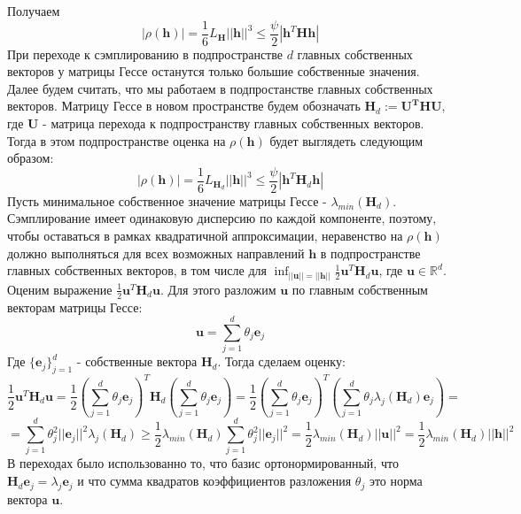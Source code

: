 \documentclass[11pt,a4paper]{article}
\begin{document}
Получаем
$$|\rho(\mathbf{h})| = \frac{1}{6}L_{\mathbf{H}}||\mathbf{h}||^3 \leq \frac{\psi}{2} |\mathbf{h}^T\mathbf{H}\mathbf{h}|$$
При переходе к сэмплированию в подпространстве $d$ главных собственных векторов у матрицы Гессе останутся только большие собственные значения.
\newline
Далее будем считать, что мы работаем в подпростанстве главных собственных векторов. \newline
Матрицу Гессе в новом пространстве будем обозначать $\mathbf{H}_d:= \mathbf{U^{\text{T}}HU}$, где $\mathbf{U}$ - матрица перехода к подпространству главных собственных векторов. \newline
Тогда в этом подпространстве оценка на $\rho(\mathbf{h})$ будет выглядеть следующим образом:
$$|\rho(\mathbf{h})| = \frac{1}{6}L_{\mathbf{H}_d}||\mathbf{h}||^3 \leq \frac{\psi}{2} |\mathbf{h}^T\mathbf{H}_d\mathbf{h}|$$
Пусть минимальное собственное значение матрицы Гессе - $\lambda_{min}(\mathbf{H}_d)$. \newline
Сэмплирование имеет одинаковую дисперсию по каждой компоненте, поэтому, чтобы оставаться в рамках квадратичной аппроксимации, неравенство на $\rho(\mathbf{h})$ должно выполняться для всех возможных направлений $\mathbf{h}$ в подпространстве главных собственных векторов, в том числе для $\displaystyle \inf_{||\mathbf{u}|| =||\mathbf{h}||}\frac{1}{2}\mathbf{u}^T\mathbf{H}_d\mathbf{u}$, где $\mathbf{u}\in \mathbb{R}^d$. 
\newline
Оценим выражение $\frac{1}{2}\mathbf{u}^T\mathbf{H}_d\mathbf{u}$. \newline
Для этого разложим $\mathbf{u}$ по главным собственным векторам матрицы Гессе:
$$\displaystyle \mathbf{u} = \sum_{j=1}^d \theta_j \mathbf{e}_j$$
Где $\{ \mathbf{e}_j \}_{j=1}^d$ - собственные вектора $\mathbf{H}_d$. \newline
Тогда сделаем оценку:
$$\frac{1}{2}\mathbf{u}^T\mathbf{H}_d\mathbf{u}=\frac{1}{2}\left( \sum_{j=1}^d \theta_j \mathbf{e}_j \right)^T \mathbf{H}_d \left( \sum_{j=1}^d \theta_j \mathbf{e}_j \right) = \frac{1}{2}\left( \sum_{j=1}^d \theta_j \mathbf{e}_j \right)^T \left( \sum_{j=1}^d \theta_j \lambda_j(\mathbf{H}_d)\mathbf{e}_j \right) = $$ $$=\sum_{j=1}^d \theta_j^2 ||\mathbf{e}_j||^2\lambda_j(\mathbf{H}_d) \geq \frac{1}{2}\lambda_{min}(\mathbf{H}_d)\sum_{j=1}^d \theta_j^2 ||\mathbf{e}_j||^2 = \frac{1}{2}\lambda_{min}(\mathbf{H}_d)||\mathbf{u}||^2 = \frac{1}{2}\lambda_{min}(\mathbf{H}_d)||\mathbf{h}||^2$$
В переходах было использованно то, что базис ортонормированный, что $\mathbf{H}_d\mathbf{e}_j=\lambda_{j}\mathbf{e}_j$ и что сумма квадратов коэффициентов разложения $\theta_j$ это норма вектора $\mathbf{u}$.
\end{document}
